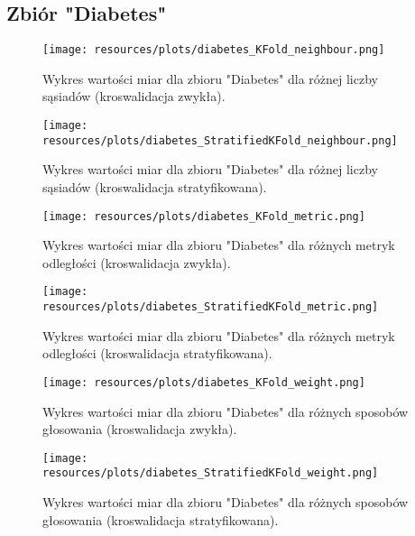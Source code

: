 \subsection{Zbiór "Diabetes"}
    \begin{figure}[H]
        \center
        \texttt{[image: resources/plots/diabetes\_KFold\_neighbour.png]}
        \caption{Wykres wartości miar dla zbioru "Diabetes" dla różnej liczby sąsiadów (kroswalidacja zwykła).}
    \end{figure}

    \begin{figure}[H]
        \center
        \texttt{[image: resources/plots/diabetes\_StratifiedKFold\_neighbour.png]}
        \caption{Wykres wartości miar dla zbioru "Diabetes" dla różnej liczby sąsiadów (kroswalidacja stratyfikowana).}
    \end{figure}

    \pagebreak

    \begin{figure}[H]
        \center
        \texttt{[image: resources/plots/diabetes\_KFold\_metric.png]}
        \caption{Wykres wartości miar dla zbioru "Diabetes" dla różnych metryk odległości (kroswalidacja zwykła).}
    \end{figure}

    \begin{figure}[H]
        \center
        \texttt{[image: resources/plots/diabetes\_StratifiedKFold\_metric.png]}
        \caption{Wykres wartości miar dla zbioru "Diabetes" dla różnych metryk odległości (kroswalidacja stratyfikowana).}
    \end{figure}

    \pagebreak

    \begin{figure}[H]
        \center
        \texttt{[image: resources/plots/diabetes\_KFold\_weight.png]}
        \caption{Wykres wartości miar dla zbioru "Diabetes" dla różnych sposobów głosowania (kroswalidacja zwykła).}
    \end{figure}

    \begin{figure}[H]
        \center
        \texttt{[image: resources/plots/diabetes\_StratifiedKFold\_weight.png]}
        \caption{Wykres wartości miar dla zbioru "Diabetes" dla różnych sposobów głosowania (kroswalidacja stratyfikowana).}
    \end{figure}
